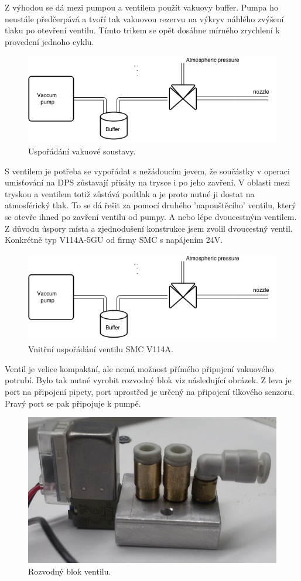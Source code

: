Z výhodou se dá mezi pumpou a ventilem použít vakuovy buffer. Pumpa ho neustále předčerpává a tvoří tak vakuovou rezervu na výkryv náhlého zvýšení tlaku po otevření ventilu. Tímto trikem se opět dosáhne mírného zrychlení k provedení jednoho cyklu.

\begin{figure}[h!]
  \centering
    \includegraphics[width=0.8\linewidth]{obrazky/vacuum.png}%
    \caption{Uspořádání vakuové soustavy.}
    \label{fig:vacuum}
\end{figure}


S ventilem je potřeba se vypořádat s nežádoucím jevem,  že součástky v operaci umisťování na DPS zůstavají přisáty na trysce i po jeho zavření. V oblasti mezi tryskou a ventilem totiž zůstává podtlak a je proto nutné ji dostat na atmosférický tlak. To se dá řešit za pomocí druhého 'napouštěcího' ventilu, který se otevře ihned po zavření ventilu od pumpy. A nebo lépe dvoucestným ventilem. Z důvodu úspory místa a zjednodušení konstrukce jsem zvolil dvoucestný ventil. Konkrétně typ V114A-5GU od firmy SMC s napájením 24V.

\begin{figure}[h!]
  \centering
    \includegraphics[width=0.3\linewidth]{obrazky/vacuum.png}%
    \caption{Vnitřní uspořádání ventilu SMC V114A.}
    \label{fig:ventil}
\end{figure}

Ventil je velice kompaktní, ale nemá možnost přímého připojení vakuového potrubí. Bylo tak nutné vyrobit rozvodný blok viz následující obrázek.  Z leva je port na připojení pipety, port uprostřed je určený na připojení tlkového senzoru. Pravý port se pak připojuje k pumpě. 

\begin{figure}[h!]
  \centering
    \includegraphics[width=0.7\linewidth]{obrazky/blok.jpg}%
    \caption{Rozvodný blok ventilu.}
    \label{fig:ventilblok}
\end{figure}

